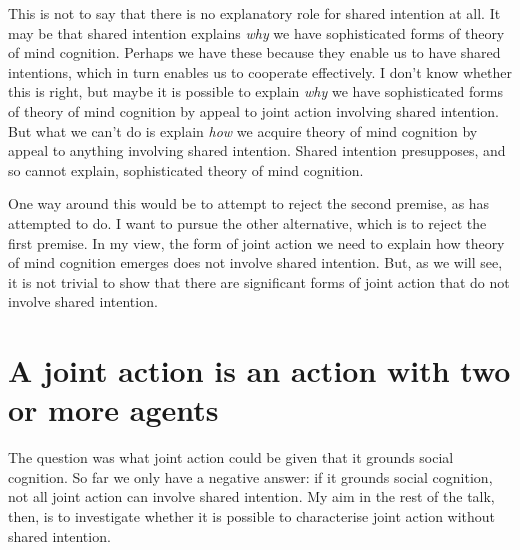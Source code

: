 \documentclass[12pt,a4paper]{extarticle}
\begin{document}
This is not to say that there is no explanatory role for shared intention at all.
It may be that shared intention explains \emph{why} we have sophisticated forms of theory of mind cognition.
Perhaps we have these because they enable us to have shared intentions, which in turn enables us to cooperate effectively.
I don't know whether this is right, but maybe it is possible to explain \emph{why} we have sophisticated forms of theory of mind cognition by appeal to joint action involving shared intention.
But what we can't do is explain \emph{how} we acquire theory of mind cognition by appeal to anything involving shared intention.
Shared intention presupposes, and so cannot explain, sophisticated theory of mind cognition.

One way around this would be to attempt to reject the second premise, as \citet{Tollefsen:2005vh} has attempted to do.
I want to pursue the other alternative, which is to reject the first premise.
In my view, the form of joint action we need to explain how theory of mind cognition emerges does not involve shared intention.
But, as we will see, it is not trivial to show that there are significant forms of joint action that do not involve shared intention.


\begin{comment}
\section{*TODO---explain challenge, insist that we want more than the ants}
[[[From a purely commonsense point of view, *** Look out of the window *** no special commitments *** problem is that this might be assimilated to the collective and cooperative behaviours of some ants *** in thinking and speaking of the action of those people, are we concerned with joint action in any sense richer than that which ants engage in?   [*Move the ants to later ... shows that notion of a collective goal is not sufficient]]]
\end{comment}




\section{A joint action is an action with two or more agents}
The question was what joint action could be given that it grounds social cognition.
So far we only have a negative answer: if it grounds social cognition, not all joint action can involve shared intention.
My aim in the rest of the talk, then, is to investigate whether it is possible to characterise joint action without shared intention.
\end{document}
